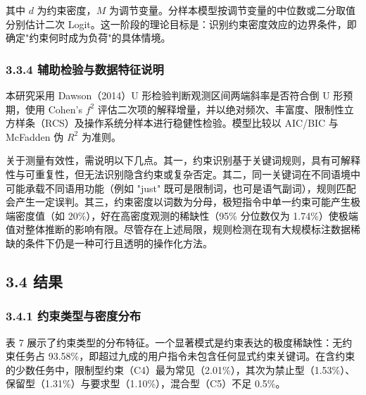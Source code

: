 \documentclass[12pt,a4paper,openany,oneside]{ctexrep}
\begin{document}
其中 $d$ 为约束密度，$M$ 为调节变量。分样本模型按调节变量的中位数或二分取值分别估计二次 Logit。这一阶段的理论目标是：识别约束密度效应的边界条件，即确定"约束何时成为负荷"的具体情境。

\subsubsection{3.3.4 辅助检验与数据特征说明}


本研究采用 Dawson（2014）U 形检验判断观测区间两端斜率是否符合倒 U 形预期，使用 Cohen's $f^2$ 评估二次项的解释增量，并以绝对频次、丰富度、限制性立方样条（RCS）及操作系统分样本进行稳健性检验。模型比较以 AIC/BIC 与 McFadden 伪 $R^2$ 为准则。

关于测量有效性，需说明以下几点。其一，约束识别基于关键词规则，具有可解释性与可重复性，但无法识别隐含约束或复杂否定。其二，同一关键词在不同语境中可能承载不同语用功能（例如 "just" 既可是限制词，也可是语气副词），规则匹配会产生一定误判。其三，约束密度以词数为分母，极短指令中单一约束可能产生极端密度值（如 20\%），好在高密度观测的稀缺性（95\% 分位数仅为 1.74\%）使极端值对整体推断的影响有限。尽管存在上述局限，规则检测在现有大规模标注数据稀缺的条件下仍是一种可行且透明的操作化方法。

\subsection{3.4 结果}


\subsubsection{3.4.1 约束类型与密度分布}


表 7 展示了约束类型的分布特征。一个显著模式是约束表达的极度稀缺性：无约束任务占 93.58\%，即超过九成的用户指令未包含任何显式约束关键词。在含约束的少数任务中，限制型约束（C4）最为常见（2.01\%），其次为禁止型（1.53\%）、保留型（1.31\%）与要求型（1.10\%），混合型（C5）不足 0.5\%。


\begin{table}[htbp]
\centering
\caption{表 7：约束类型分布（原始样本 $N=22{,}811$）}
\small
{}
\end{table}
\end{document}

